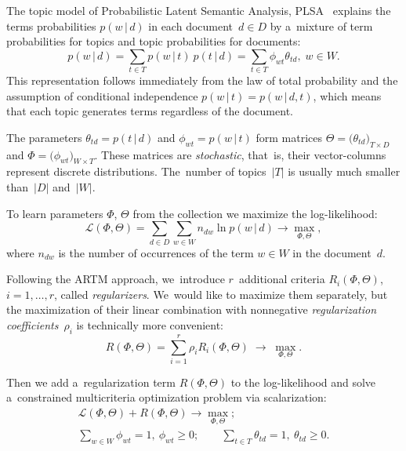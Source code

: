 \documentclass{sig-alternate-2013}
\newcommand{\cond}{\mspace{3mu}{|}\mspace{3mu}}
\newcommand{\cL}{\mathscr{L}}
\begin{document}
The topic model of Probabilistic Latent Semantic Analysis, PLSA~\cite{hofmann99plsi}
explains the terms probabilities $p(w\cond d)$ in each document~${d\in D}$
by a~mixture of term probabilities for topics and topic probabilities for documents:
\[
    p(w\cond d)
    = \sum_{t\in T} p(w\cond t)\: p(t\cond d)
    = \sum_{t\in T} \phi_{wt} \theta_{td},\;
    w\in W.
\]
This representation follows immediately from the law of total probability
and the assumption of conditional independence $p(w\cond t) = p(w\cond d,t)$,
which means that each topic generates terms regardless of the document.

The parameters
${\theta_{td}=p(t\cond d)}$ and ${\phi_{wt}=p(w\cond t)}$
form matrices
${\Theta = \bigl( \theta_{td} \bigr)_{T\times D}}$ and
${\Phi = \bigl( \phi_{wt} \bigr)_{W\times T}}$.
These matrices are \emph{stochastic},
that~is, their vector-columns represent discrete distributions.
The~number of topics~$|T|$ is usually much smaller than~$|D|$ and~$|W|$.

To learn parameters $\Phi$, $\Theta$ from the collection
we maximize the log-likelihood:
\[
    \cL (\Phi,\Theta) =
    \sum_{d\in D}\sum_{w\in W} n_{dw} \ln p(w\cond d)
    \to \max_{\Phi,\Theta},
\]
where
$n_{dw}$ is the number of occurrences of the term ${w\in W}$ in the document~$d$.

Following the ARTM approach,
we~introduce $r$~additional criteria
$R_i(\Phi,\Theta)$,\; ${i=1,\dots,r}$,
called \emph{regularizers}.
We~would like to maximize them separately,
but the maximization of their linear combination
with nonnegative \emph{regularization coefficients}~$\rho_i$
is technically more convenient:
\[
    R(\Phi,\Theta) =
    \sum_{i=1}^r \rho_i R_i(\Phi,\Theta)
    \;\to\; \max_{\Phi,\Theta}.
\]

Then we add a~regularization term $R(\Phi,\Theta)$ to the log-likelihood
and solve a~constrained multicriteria optimization problem via scalarization:
\begin{gather}
\label{eq:ARTM}
    \cL (\Phi,\Theta) + R(\Phi,\Theta) \to \max_{\Phi,\Theta};
\\\label{eq:ARTM:norm}
    \sum_{w\in W}\!\!\! \phi_{wt} = 1,~
    \phi_{wt}\geq 0;
    \qquad
    \sum_{t\in T} \theta_{td} = 1,~
    \theta_{td}\geq 0.
\end{gather}
\end{document}
